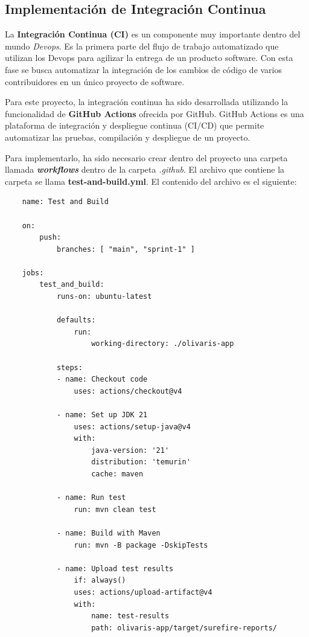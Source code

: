 \subsection{Implementación de Integración Continua}

La \textbf{Integración Continua (CI)} \cite{ci} es un componente muy importante dentro del mundo \textit{Devops}. Es la primera parte del flujo de trabajo automatizado que utilizan los
Devops para agilizar la entrega de un producto software. Con esta fase se busca automatizar la integración de los cambios de código de varios contribuidores en un único proyecto de software.

Para este proyecto, la integración continua ha sido desarrollada utilizando la funcionalidad de \textbf{GitHub Actions} ofrecida por GitHub. GitHub Actions es una plataforma de integración y 
despliegue continua (CI/CD) que permite automatizar las pruebas, compilación y despliegue de un proyecto. 

Para implementarlo, ha sido necesario crear dentro del proyecto una carpeta llamada \textbf{\textit{workflows}} dentro de la carpeta \textit{.github}. El archivo que contiene la carpeta se llama
\textbf{test-and-build.yml}. El contenido del archivo es el siguiente:

\begin{verbatim}
    name: Test and Build

    on:
        push:
            branches: [ "main", "sprint-1" ]

    jobs:
        test_and_build:
            runs-on: ubuntu-latest
            
            defaults:
                run:
                    working-directory: ./olivaris-app

            steps:
            - name: Checkout code
                uses: actions/checkout@v4

            - name: Set up JDK 21
                uses: actions/setup-java@v4
                with:
                    java-version: '21'
                    distribution: 'temurin'
                    cache: maven

            - name: Run test
                run: mvn clean test

            - name: Build with Maven
                run: mvn -B package -DskipTests
            
            - name: Upload test results
                if: always()
                uses: actions/upload-artifact@v4
                with:
                    name: test-results
                    path: olivaris-app/target/surefire-reports/
\end{verbatim}


